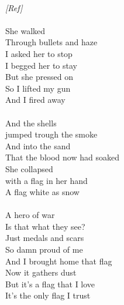 {\\
\emph{[Ref]}\\
\\
She walked\\
Through bullets and haze\\
I asked her to stop\\
I begged her to stay\\
But she pressed on\\
So I lifted my gun\\
And I fired away\\
\\
And the shells\\
jumped trough the smoke\\
And into the sand\\
That the blood now had soaked\\
She collapsed\\
with a flag in her hand\\
A flag white as snow\\
\\
A hero of war\\
Is that what they see?\\
Just medals and scars\\
So damn proud of me\\
And I brought home that flag\\
Now it gathers dust\\
But it's a flag that I love\\
It's the only flag I trust
}




